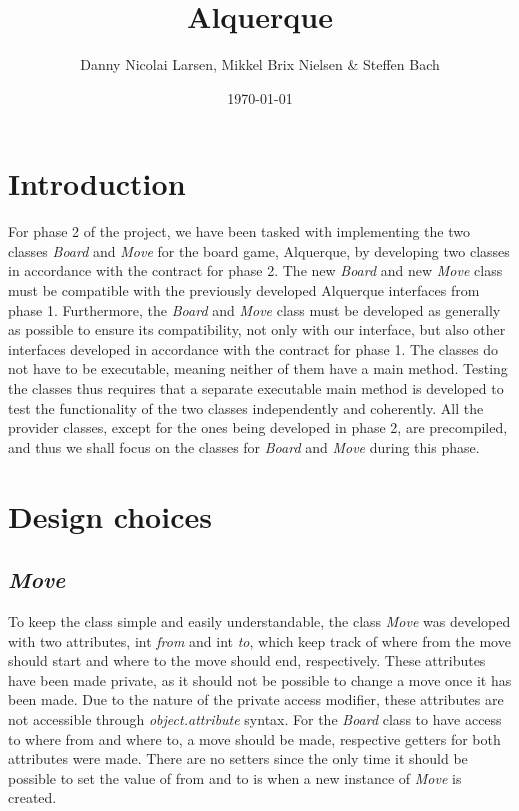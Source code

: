 \documentclass[12pt, a4paper]{article}
\title{Alquerque}
\author{Danny Nicolai Larsen, Mikkel Brix Nielsen \& Steffen Bach}
\date{\today}
\begin{document}
\maketitle
\newpage
\tableofcontents
\newpage

\section{Introduction}

For phase 2 of the project, we have been tasked with implementing the two classes \emph{Board} and \emph{Move} for the board game, Alquerque, by developing two classes in accordance with the contract for phase 2. The new \emph{Board} and new \emph{Move} class must be compatible with the previously developed Alquerque interfaces from phase 1. Furthermore, the \emph{Board} and \emph{Move} class must be developed as generally as possible to ensure its compatibility, not only with our interface, but also other interfaces developed in accordance with the contract for phase 1. The classes do not have to be executable, meaning neither of them have a main method. Testing the classes thus requires that a separate executable main method is developed to test the functionality of the two classes independently and coherently. All the provider classes, except for the ones being developed in phase 2, are precompiled, and thus we shall focus on the classes for \emph{Board} and \emph{Move} during this phase.

\section{Design choices}

\subsection{\emph{Move}}
To keep the class simple and easily understandable, the class \emph{Move} was developed with two attributes, int \emph{from} and int \emph{to}, which keep track of where from the move should start and where to the move should end, respectively.
These attributes have been made private, as it should not be possible to change a move once it has been made. Due to the nature of the private access modifier, these attributes are not accessible through \emph{object.attribute} syntax. For the \emph{Board} class to have access to where from and where to, a move should be made, respective getters for both attributes were made. There are no setters since the only time it should be possible to set the value of from and to is when a new instance of \emph{Move} is created. 
\end{document}
